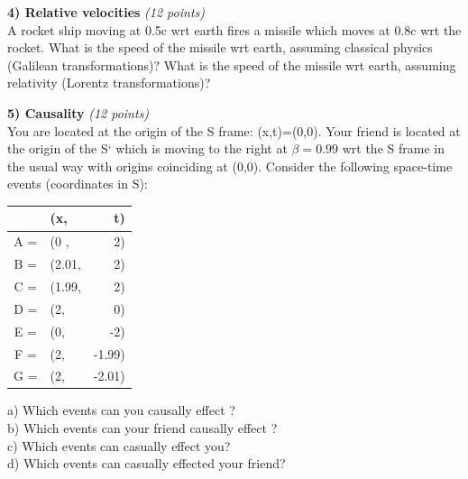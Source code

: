 {\clearpage

\textbf{4) Relative velocities }\hfill \textit{(12 points)}\\

A rocket ship moving at 0.5c wrt earth fires a missile which moves at 0.8c wrt the rocket.
What is the speed of the missile wrt earth, assuming classical physics (Galilean transformations)?
What is the speed of the missile wrt earth, assuming relativity (Lorentz transformations)?

\vspace{2.8in}

\textbf{5) Causality}  \hfill \textit{(12 points)}\\
You are located at the origin of the S frame: (x,t)=(0,0).
Your friend is located at the origin of the S` which is moving to the right at $\beta = 0.99$ wrt the S frame in the usual way with origins coinciding at (0,0).
Consider the following space-time events (coordinates in S):\\
\begin{tabular}{clr}
  & (x,& t)\\
  \hline
  A = & (0   , & 2)\\
  B = & (2.01, & 2)\\
  C = & (1.99, & 2)\\
  D = & (2,    & 0)\\
  E = & (0,    & -2)\\
  F = & (2,    & -1.99)\\
  G = & (2,    & -2.01)\\
\end{tabular}

\vspace{0.1in}

a) Which events can you causally effect ?\\

b) Which events can your friend causally effect ?\\

c) Which events can casually effect you?\\

d) Which events can casually effected your friend?

%
\clearpage

}
